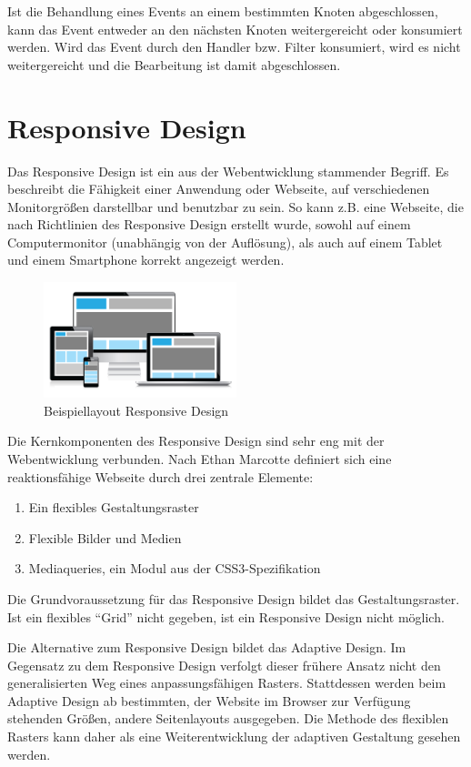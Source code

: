 Ist die Behandlung eines Events an einem bestimmten Knoten abgeschlossen, kann das Event entweder an den nächsten Knoten weitergereicht oder konsumiert werden. Wird das Event durch den Handler bzw. Filter konsumiert, wird es nicht weitergereicht und die Bearbeitung ist damit abgeschlossen.\par
\section{Responsive Design}
Das Responsive Design ist ein aus der Webentwicklung stammender Begriff. Es beschreibt die Fähigkeit einer Anwendung oder Webseite, auf verschiedenen Monitorgrößen darstellbar und benutzbar zu sein. So kann z.B. eine Webseite, die nach Richtlinien des Responsive Design erstellt wurde, sowohl auf einem Computermonitor (unabhängig von der Auflösung), als auch auf einem Tablet und einem Smartphone korrekt angezeigt werden.\par
\begin{figure}[H]
 \centering
 \includegraphics[width=0.5\textwidth]{grafiken/responsive_design.png}
 \caption[Beispiellayout Responsive Design]{Beispiellayout Responsive Design \cite{Moon2013}}
 \label{fig:responsiveDesign}
\end{figure}
Die Kernkomponenten des Responsive Design sind sehr eng mit der Webentwicklung verbunden. Nach Ethan Marcotte definiert sich eine reaktionsfähige Webseite durch drei zentrale Elemente:
\begin{enumerate}
 \item Ein flexibles Gestaltungsraster
 \item Flexible Bilder und Medien
 \item Mediaqueries, ein Modul aus der CSS3-Spezifikation \cite[S. 15]{Zillgens2012}
\end{enumerate}
Die Grundvoraussetzung für das Responsive Design bildet das Gestaltungsraster. Ist ein flexibles \enquote{Grid} nicht gegeben, ist ein Responsive Design nicht möglich.\cite[S. 15]{Zillgens2012}\par
Die Alternative zum Responsive Design bildet das Adaptive Design. Im Gegensatz zu dem Responsive Design verfolgt dieser frühere Ansatz nicht den generalisierten Weg eines anpassungsfähigen Rasters. Stattdessen werden beim Adaptive Design ab bestimmten, der Website im Browser zur Verfügung stehenden Größen, andere Seitenlayouts ausgegeben. Die Methode des flexiblen Rasters kann daher als eine Weiterentwicklung der adaptiven Gestaltung gesehen werden.\cite[S. 14]{Zillgens2012}\par
